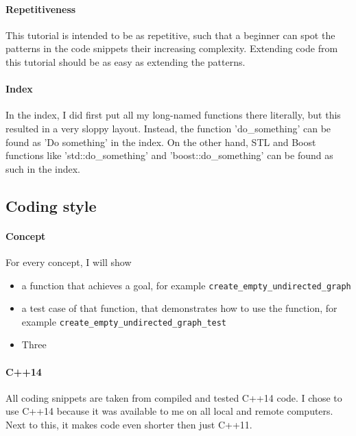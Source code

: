 \paragraph{Repetitiveness}

This tutorial is intended to be as repetitive, such that a beginner can
 spot the patterns in the code snippets their increasing complexity.
 Extending code from this tutorial should be as easy as extending the patterns.

\paragraph{Index}

In the index, I did first put all my long-named functions there literally,
but this resulted in a very sloppy layout.
Instead, the function 'do\_something' can be found as 'Do something' in
the index.
On the other hand, STL and Boost functions like 'std::do\_something' and
'boost::do\_something' can be found as such in the index.

\subsection{Coding style}

\paragraph{Concept}

For every concept, I will show

\begin{itemize}
    \item a function that achieves a goal, 
      for example \verb;create_empty_undirected_graph;
    \item{
      a test case of that function, 
      that demonstrates how to use the function, for example
      \verb;create_empty_undirected_graph_test;
    }
    \item Three
\end{itemize}

\paragraph{C++14}

All coding snippets are taken from compiled and tested C++14 code.
I chose to use C++14 because it was available to me on all local and remote
computers.
Next to this, it makes code even shorter then just C++11.

